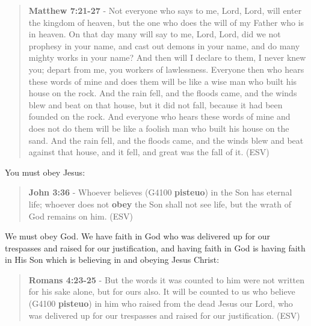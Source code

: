 \documentclass[11pt]{article}
\begin{document}
\begin{quote}
\textbf{Matthew 7:21-27} - Not everyone who says to me, Lord, Lord, will enter the kingdom of heaven, but the one who does the will of my Father who is in heaven.  On that day many will say to me, Lord, Lord, did we not prophesy in your name, and cast out demons in your name, and do many mighty works in your name?  And then will I declare to them, I never knew you; depart from me, you workers of lawlessness.  Everyone then who hears these words of mine and does them will be like a wise man who built his house on the rock.  And the rain fell, and the floods came, and the winds blew and beat on that house, but it did not fall, because it had been founded on the rock.  And everyone who hears these words of mine and does not do them will be like a foolish man who built his house on the sand.  And the rain fell, and the floods came, and the winds blew and beat against that house, and it fell, and great was the fall of it. (ESV)
\end{quote}

You must obey Jesus:

\begin{quote}
\textbf{John 3:36} - Whoever believes (G4100 \textbf{pisteuo}) in the Son has eternal life; whoever does not \textbf{obey} the Son shall not see life, but the wrath of God remains on him. (ESV)
\end{quote}

We must obey God. We have faith in God who was delivered up for our trespasses and raised for our justification, and having faith in God is having faith in His Son which is believing in and obeying Jesus Christ:

\begin{quote}
\textbf{Romans 4:23-25} - But the words it was counted to him were not written for his sake alone, but for ours also. It will be counted to us who believe (G4100 \textbf{pisteuo}) in him who raised from the dead Jesus our Lord, who was delivered up for our trespasses and raised for our justification. (ESV)
\end{quote}
\end{document}
